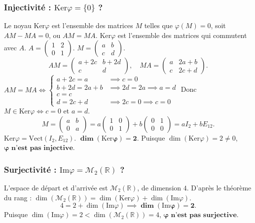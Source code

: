 \documentclass[french]{yLectureNote}
\begin{document}
\subsubsection*{Injectivité : $\mathrm{Ker}\varphi = \{0\}$ ?}
Le noyau $\mathrm{Ker}\varphi$ est l'ensemble des matrices $M$ telles que $\varphi(M) = 0$, soit $AM-MA=0$, ou $AM=MA$. $\mathrm{Ker}\varphi$ est l'ensemble des matrices qui commutent avec $A$.
$A = \begin{pmatrix} 1 & 2 \\ 0 & 1 \end{pmatrix}$. $M = \begin{pmatrix} a & b \\ c & d \end{pmatrix}$.
$$AM = \begin{pmatrix} a+2c & b+2d \\ c & d \end{pmatrix}, \quad MA = \begin{pmatrix} a & 2a+b \\ c & 2c+d \end{pmatrix}.$$
$AM = MA \iff \begin{cases} a+2c = a & \implies c=0 \\ b+2d = 2a+b & \implies 2d=2a \implies a=d \\ c = c \\ d = 2c+d & \implies 2c=0 \implies c=0 \end{cases}$
Donc $M \in \mathrm{Ker}\varphi \iff c=0$ et $a=d$.
$$M = \begin{pmatrix} a & b \\ 0 & a \end{pmatrix} = a \begin{pmatrix} 1 & 0 \\ 0 & 1 \end{pmatrix} + b \begin{pmatrix} 0 & 1 \\ 0 & 0 \end{pmatrix} = a I_2 + b E_{12}.$$
$\mathrm{Ker}\varphi = \mathrm{Vect}(I_2, E_{12})$. $\mathbf{\dim(\mathrm{Ker}\varphi) = 2}$.
Puisque $\dim(\mathrm{Ker}\varphi) = 2 \ne 0$, $\mathbf{\varphi \text{ n'est pas injective}}$.

\subsubsection*{Surjectivité : $\mathrm{Im}\varphi = \mathcal{M}_2(\mathbb{R})$ ?}
L'espace de départ et d'arrivée est $\mathcal{M}_2(\mathbb{R})$, de dimension $4$.
D'après le théorème du rang : $\dim(\mathcal{M}_2(\mathbb{R})) = \dim(\mathrm{Ker}\varphi) + \dim(\mathrm{Im}\varphi)$.
$$4 = 2 + \dim(\mathrm{Im}\varphi) \implies \mathbf{\dim(\mathrm{Im}\varphi) = 2}.$$
Puisque $\dim(\mathrm{Im}\varphi) = 2 < \dim(\mathcal{M}_2(\mathbb{R})) = 4$, $\mathbf{\varphi \text{ n'est pas surjective}}$.
\end{document}
